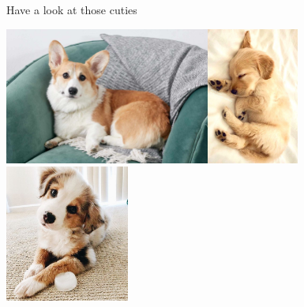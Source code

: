 \documentclass{beamer}
\begin{document}
\begin{frame}{Have a look at those cuties}
\begin{center}
\includegraphics[width=.3\linewidth,height=4.5cm]{photos/breed_profile_corgi_1117986_recirc_917-ac4ab4ec3cb6469397c6c023e7c28b28.jpg}\quad\includegraphics[width=.3\linewidth,height=4.5cm]{photos/ef1dc3b0c5c1cbd7d7d0a27cdcb06e3b.jpg}\quad\includegraphics[width=.3\linewidth,height=4.5cm]{photos/fa41ace1ab4cde11018a9b224e488806.jpg}
\\[\baselineskip]
\end{center}

    
\end{frame}
\end{document}
